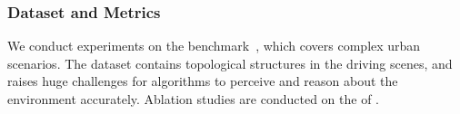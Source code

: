 \begin{table}[t!]
    \centering
    \caption{\textbf{Comparison on BEV segmentation.} When rendering centerlines on the BEV grids, \algname also outperforms the previous approach.}
    \label{tab:sota-seg}
    \vspace{-5px}
\end{table}

\subsubsection{Dataset and Metrics}

We conduct experiments on the \datasetname benchmark~\cite{openlanev2}, which covers complex urban scenarios. 
The dataset contains topological structures in the driving scenes, and raises huge challenges for algorithms to perceive and reason about the environment accurately.
Ablation studies are conducted on the  of \datasetname.

